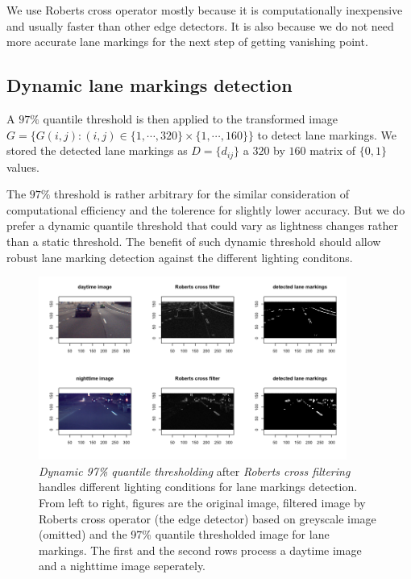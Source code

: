 \documentclass[11pt, oneside]{article}
\begin{document}
We use Roberts cross operator mostly because it is computationally inexpensive and usually faster than other edge detectors. It is also because we do not need more accurate lane markings for the next step of getting vanishing point. 

\subsection*{Dynamic lane markings detection}

A $97\%$ quantile threshold is then applied to the transformed image 
$G= \{G(i, j): (i, j) \in \{1, \cdots, 320\} \times \{1, \cdots, 160\} \}$ to detect lane markings. We stored the detected lane markings as $D = \{d_{ij}\}$ a $320$ by $160$ matrix of $\{0, 1\}$ values. 

The $97\%$ threshold is rather arbitrary for the similar consideration of computational efficiency and the tolerence for slightly lower accuracy. But we do prefer a dynamic quantile threshold that could vary as lightness changes rather than a static threshold. The benefit of such dynamic threshold should allow robust lane marking detection against the different lighting conditons. 

\begin{figure}[!ht] 
  \centering
      \includegraphics[width=0.9\textwidth]{Rplot1.png} 
  \caption{ \textit{Dynamic 97\% quantile thresholding} after \textit{Roberts cross filtering} handles different lighting conditions for lane markings detection. From left to right, figures are the original image, filtered image by Roberts cross operator (the edge detector) based on greyscale image (omitted) and the 97\% quantile thresholded image for lane markings. The first and the second rows process a daytime image and a nighttime image seperately. }
  \label{fig:Figure 1}
\end{figure}
\end{document}
